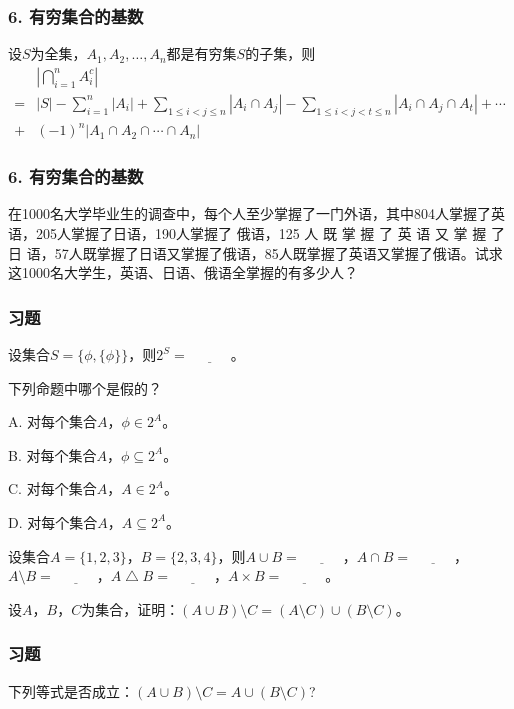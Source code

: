 \documentclass{beamer}
\begin{document}
\begin{CJK*}{UTF8}{gbsn}
\begin{frame}
\frametitle{6. 有穷集合的基数}
\begin{Thm}
  设$S$为全集，$A_1, A_2, \ldots, A_n$都是有穷集$S$的子集，则
  \begin{equation*}
    \begin{split}
      &|\bigcap_{i=1}^nA_{i}^c|\\
=&|S| - \sum_{i=1}^n|A_i| + \sum_{1\leq i < j \leq n}|A_i \cap A_j|
-\sum_{1 \leq  i < j < t \leq n}|A_i \cap A_j \cap A_t| + \cdots \\
+&(-1)^n|A_1 \cap A_2 \cap \cdots \cap A_n|
    \end{split}
  \end{equation*}
\end{Thm}
\end{frame}

\begin{frame}
\frametitle{6. 有穷集合的基数}
\begin{Ex}
  在1000名大学毕业生的调查中，每个人至少掌握了一门外语，其中804人掌握了英语，205人掌握了日语，190人掌握了 俄语，125  人 既 掌 握 了 英 语 又 掌 握 了 日 语，57人既掌握了日语又掌握了俄语，85人既掌握了英语又掌握了俄语。试求这1000名大学生，英语、日语、俄语全掌握的有多少人？
\end{Ex}
\end{frame}
\begin{frame}
  \frametitle{习题}
    \begin{Exercise}
   设集合$S=\{\phi, \{\phi\}\}$，则$2^S=\underline{\quad\quad\quad}$。
  \end{Exercise}
  \begin{Exercise}
    下列命题中哪个是假的？

    A. 对每个集合$A$，$\phi \in 2^A$。

    B. 对每个集合$A$，$\phi \subseteq 2^A$。

    C. 对每个集合$A$，$A \in 2^A$。

    D. 对每个集合$A$，$A \subseteq 2^A$。
  \end{Exercise}
  \begin{Exercise}
    设集合$A=\{1,2,3\}$，$B=\{2,3,4\}$，则$A\cup B=\underline{\quad\quad\quad}$，$A\cap B=\underline{\quad\quad\quad}$，$A\setminus B=\underline{\quad\quad\quad}$，$A\bigtriangleup B=\underline{\quad\quad\quad}$，$A\times B=\underline{\quad\quad\quad}$。
  \end{Exercise}
  \begin{Exercise}
   设$A$，$B$，$C$为集合，证明：$(A\cup B) \setminus C = (A\setminus C) \cup
   (B\setminus C)$。
  \end{Exercise}
\end{frame}
\begin{frame}
  \frametitle{习题}
    \begin{Exercise}
      下列等式是否成立：$(A\cup B) \setminus C = A \cup (B\setminus C)$?
    \end{Exercise}


\end{frame}
\end{CJK*}
\end{document}
